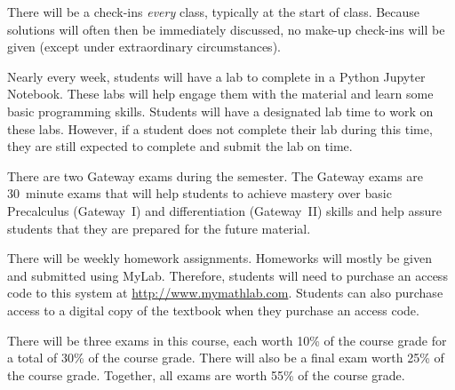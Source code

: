 \documentclass[11pt,letterpaper]{article}
\begin{document}
There will be a check-ins \textit{every} class, typically at the start of class. Because solutions will often then be immediately discussed, no make-up check-ins will be given (except under extraordinary circumstances). \pspace


Nearly every week, students will have a lab to complete in a Python Jupyter Notebook. These labs will help engage them with the material and learn some basic programming skills. Students will have a designated lab time to work on these labs. However, if a student does not complete their lab during this time, they are still expected to complete and submit the lab on time.
\pspace


There are two Gateway exams during the semester. The Gateway exams are 30~minute exams that will help students to achieve mastery over basic Precalculus (Gateway~I) and differentiation (Gateway~II) skills and help assure students that they are prepared for the future material. 
\pspace



\newpage



There will be weekly homework assignments. Homeworks will mostly be given and submitted using MyLab. Therefore, students will need to purchase an access code to this system at \url{http://www.mymathlab.com}. Students can also purchase access to a digital copy of the textbook when they purchase an access code.
\pspace


There will be three exams in this course, each worth 10\% of the course grade for a total of 30\% of the course grade. There will also be a final exam worth 25\% of the course grade. Together, all exams are worth 55\% of the course grade. 
\pspace
\end{document}
